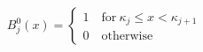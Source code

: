 \documentclass[preview]{standalone}
\begin{document}
\begin{align*}
B_j^0(x) = \begin{cases} 1 \quad \text{for} \ \kappa_j \le x < \kappa_{j+1} \\ 0 \quad \text{otherwise} \end{cases}
\end{align*}
\end{document}
